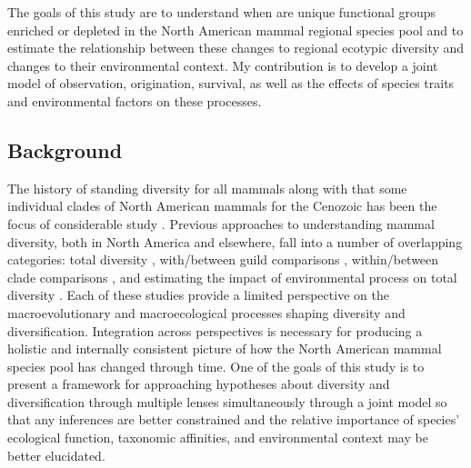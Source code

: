 \documentclass[12pt,letterpaper]{article}
\begin{document}
The goals of this study are to understand when are unique functional groups enriched or depleted in the North American mammal regional species pool and to estimate the relationship between these changes to regional ecotypic diversity and changes to their environmental context. My contribution is to develop a joint model of observation, origination, survival, as well as the effects of species traits and environmental factors on these processes.

\subsection*{Background}

The history of standing diversity for all mammals along with that some individual clades of North American mammals for the Cenozoic has been the focus of considerable study \citep{Alroy2009,Alroy1996a,Janis1993b,Alroy2000g,Figueirido2012,Pires2015a,Fraser2015a,Smits2015b,Quental2013,Slater2015c,Silvestro2015b,Badgley2013,Blois2009,Janis1993c}. Previous approaches to understanding mammal diversity, both in North America and elsewhere, fall into a number of overlapping categories: total diversity \citep{Alroy2000g,Alroy1996a,Figueirido2012,Liow2008}, with/between guild comparisons \citep{Janis2004,Janis2000,Jernvall2004,Janis1993c,Pires2015a,Janis2008a}, within/between clade comparisons \citep{Quental2013,Slater2015c,Silvestro2015b,Fraser2015a,Cantalapiedra2017}, and estimating the impact of environmental process on total diversity \citep{Blois2009,Janis1993c,Janis1993b,Fraser2015a,Eronen2015,Badgley2013,Badgley2017,Alroy2000g}. Each of these studies provide a limited perspective on the macroevolutionary and macroecological processes shaping diversity and diversification. Integration across perspectives is necessary for producing a holistic and internally consistent picture of how the North American mammal species pool has changed through time. One of the goals of this study is to present a framework for approaching hypotheses about diversity and diversification through multiple lenses simultaneously through a joint model so that any inferences are better constrained and the relative importance of species' ecological function, taxonomic affinities, and environmental context may be better elucidated.
\end{document}
